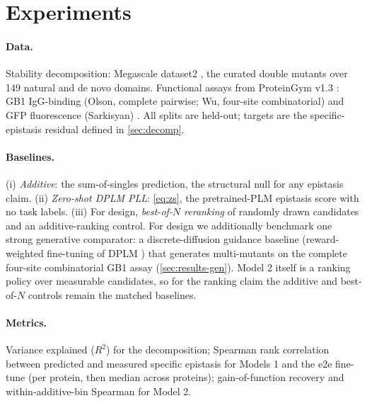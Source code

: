 \documentclass{article}
\begin{document}
\section{Experiments}
\label{sec:exp}

\paragraph{Data.}
Stability decomposition: Megascale dataset2 \citep{tsuboyama2023mega}, the curated
double mutants over 149 natural and de novo domains. Functional assays from
ProteinGym v1.3 \citep{notin2023proteingym}: GB1 IgG-binding (Olson, complete
pairwise; Wu, four-site combinatorial)
\citep{olson2014comprehensive,wu2016adaptation} and GFP fluorescence (Sarkisyan)
\citep{sarkisyan2016local}. All splits are held-out; targets are the
specific-epistasis residual defined in \cref{sec:decomp}.

\paragraph{Baselines.}
(i) \emph{Additive}: the sum-of-singles prediction, the structural null for any
epistasis claim. (ii) \emph{Zero-shot DPLM PLL}: \cref{eq:zs}, the pretrained-PLM
epistasis score with no task labels. (iii) For design, \emph{best-of-$N$
reranking} of randomly drawn candidates and an additive-ranking control. For design we additionally benchmark one strong generative comparator: a
discrete-diffusion guidance baseline (reward-weighted fine-tuning of DPLM
\citep{wang2025drakes,li2024svdd,gruver2023protein,nisonoff2025unlocking}) that
generates multi-mutants on the complete four-site combinatorial GB1 assay
(\cref{sec:results-gen}). Model 2 itself is a ranking policy over measurable
candidates, so for the ranking claim the additive and best-of-$N$ controls remain
the matched baselines.

\paragraph{Metrics.}
Variance explained ($R^2$) for the decomposition; Spearman rank correlation
between predicted and measured specific epistasis for Models 1 and the e2e
fine-tune (per protein, then median across proteins); gain-of-function recovery
and within-additive-bin Spearman for Model 2.
\end{document}
